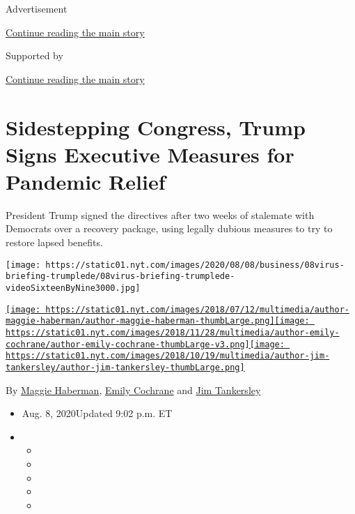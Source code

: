 Advertisement

\protect\hyperlink{after-top}{Continue reading the main story}

Supported by

\protect\hyperlink{after-sponsor}{Continue reading the main story}

\hypertarget{sidestepping-congress-trump-signs-executive-measures-for-pandemic-relief}{%
\section{Sidestepping Congress, Trump Signs Executive Measures for
Pandemic
Relief}\label{sidestepping-congress-trump-signs-executive-measures-for-pandemic-relief}}

President Trump signed the directives after two weeks of stalemate with
Democrats over a recovery package, using legally dubious measures to try
to restore lapsed benefits.

\texttt{[image: https://static01.nyt.com/images/2020/08/08/business/08virus-briefing-trumplede/08virus-briefing-trumplede-videoSixteenByNine3000.jpg]}

\href{https://www.nytimes.com/by/maggie-haberman}{\texttt{[image: https://static01.nyt.com/images/2018/07/12/multimedia/author-maggie-haberman/author-maggie-haberman-thumbLarge.png]}}\href{https://www.nytimes.com/by/emily-cochrane}{\texttt{[image: https://static01.nyt.com/images/2018/11/28/multimedia/author-emily-cochrane/author-emily-cochrane-thumbLarge-v3.png]}}\href{https://www.nytimes.com/by/jim-tankersley}{\texttt{[image: https://static01.nyt.com/images/2018/10/19/multimedia/author-jim-tankersley/author-jim-tankersley-thumbLarge.png]}}

By \href{https://www.nytimes.com/by/maggie-haberman}{Maggie Haberman},
\href{https://www.nytimes.com/by/emily-cochrane}{Emily Cochrane} and
\href{https://www.nytimes.com/by/jim-tankersley}{Jim Tankersley}

\begin{itemize}
\item
  Aug. 8, 2020Updated 9:02 p.m. ET
\item
  \begin{itemize}
  \item
  \item
  \item
  \item
  \item
  \end{itemize}
\end{itemize}

